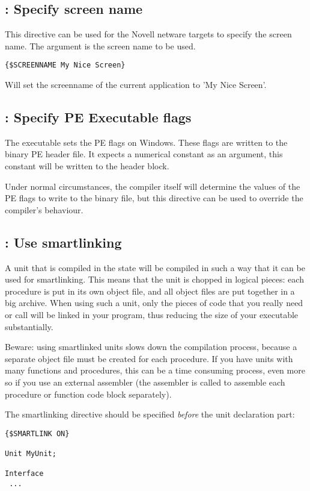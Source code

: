 \subsection{ : Specify screen name}
This directive can be used for the Novell netware targets to specify the screen name. 
The argument is the screen name to be used.
\begin{verbatim}
{$SCREENNAME My Nice Screen}
\end{verbatim}
Will set the screenname of the current application to 'My Nice Screen'.

\subsection{ : Specify PE Executable flags}
The  executable sets the PE flags on Windows. These 
flags are written to the binary PE header file. It expects a numerical
constant as an argument, this constant will be written to the header block.

Under normal circumstances, the compiler itself will determine the values of
the PE flags to write to the binary file, but this directive can be used to
override the compiler's behaviour.
 
\subsection{ : Use smartlinking}

A unit that is compiled in the  state will be
compiled in such a way that it can be used for smartlinking. This means that
the unit is chopped in logical pieces: each procedure is put in its own
object file, and all object files are put together in a big archive. When
using such a unit, only the pieces of code that you really need or call
will be linked in your program, thus reducing the size of your executable
substantially.

Beware: using smartlinked units slows down the compilation process, because
a separate object file must be created for each procedure. If you have units
with many functions and procedures, this can be a time consuming process,
even more so if you use an external assembler (the assembler is called to
assemble each procedure or function code block separately).

The smartlinking directive should be specified {\em before} the unit
declaration part:
\begin{verbatim}
{$SMARTLINK ON}

Unit MyUnit;

Interface
 ...
\end{verbatim}

